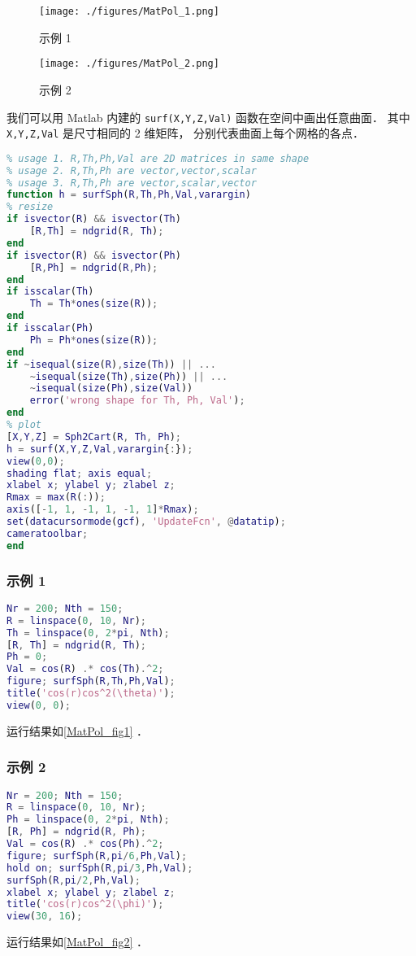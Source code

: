 
\begin{issues}
\issueAbstract
\end{issues}

\begin{figure}[ht]
\centering
\texttt{[image: ./figures/MatPol\_1.png]}
\caption{示例 1} \label{MatPol_fig1}
\end{figure}
\begin{figure}[ht]
\centering
\texttt{[image: ./figures/MatPol\_2.png]}
\caption{示例 2} \label{MatPol_fig2}
\end{figure}

我们可以用 Matlab 内建的 \verb|surf(X,Y,Z,Val)| 函数在空间中画出任意曲面． 其中 \verb|X,Y,Z,Val| 是尺寸相同的 2 维矩阵， 分别代表曲面上每个网格的各点．
\begin{lstlisting}[language=matlab, caption=surfSph.m]
% surf() in spherical coordinate
% usage 1. R,Th,Ph,Val are 2D matrices in same shape
% usage 2. R,Th,Ph are vector,vector,scalar
% usage 3. R,Th,Ph are vector,scalar,vector
function h = surfSph(R,Th,Ph,Val,varargin)
% resize
if isvector(R) && isvector(Th)
    [R,Th] = ndgrid(R, Th);
end
if isvector(R) && isvector(Ph)
    [R,Ph] = ndgrid(R,Ph);
end
if isscalar(Th)
    Th = Th*ones(size(R));
end
if isscalar(Ph)
    Ph = Ph*ones(size(R));
end
if ~isequal(size(R),size(Th)) || ...
    ~isequal(size(Th),size(Ph)) || ...
    ~isequal(size(Ph),size(Val))
    error('wrong shape for Th, Ph, Val');
end
% plot
[X,Y,Z] = Sph2Cart(R, Th, Ph);
h = surf(X,Y,Z,Val,varargin{:});
view(0,0);
shading flat; axis equal;
xlabel x; ylabel y; zlabel z;
Rmax = max(R(:));
axis([-1, 1, -1, 1, -1, 1]*Rmax);
set(datacursormode(gcf), 'UpdateFcn', @datatip);
cameratoolbar;
end
\end{lstlisting}

\subsubsection{示例 1}
\begin{lstlisting}[language=matlab]
Nr = 200; Nth = 150;
R = linspace(0, 10, Nr);
Th = linspace(0, 2*pi, Nth);
[R, Th] = ndgrid(R, Th);
Ph = 0;
Val = cos(R) .* cos(Th).^2;
figure; surfSph(R,Th,Ph,Val);
title('cos(r)cos^2(\theta)');
view(0, 0);
\end{lstlisting}
运行结果如\autoref{MatPol_fig1} ．

\subsubsection{示例 2}
\begin{lstlisting}[language=matlab]
Nr = 200; Nth = 150;
R = linspace(0, 10, Nr);
Ph = linspace(0, 2*pi, Nth);
[R, Ph] = ndgrid(R, Ph);
Val = cos(R) .* cos(Ph).^2;
figure; surfSph(R,pi/6,Ph,Val);
hold on; surfSph(R,pi/3,Ph,Val);
surfSph(R,pi/2,Ph,Val);
xlabel x; ylabel y; zlabel z;
title('cos(r)cos^2(\phi)');
view(30, 16);
\end{lstlisting}
运行结果如\autoref{MatPol_fig2} ．

